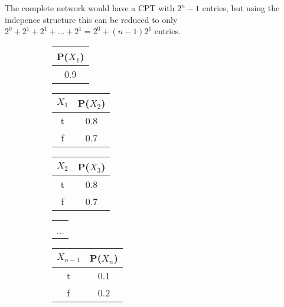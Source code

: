 \documentclass[12pt, letterpaper]{article}
\begin{document}
The complete network would have a CPT with $2^n-1$ entries, but using
the indepence structure this can be reduced to only
$2^0+2^1+2^1+...+2^1 = 2^0 + (n-1)2^1$ entries.

\begin{figure}[H]
  \begin{subfigure}[t]{0.14\textwidth}
    \begin{tabular}[t]{|c|}
      \hline
      P($X_1$) \\
      \hline
      0.9 \\
      \hline
    \end{tabular}
  \end{subfigure}
  \begin{subfigure}[t]{0.2\textwidth}
    \begin{tabular}[t]{|c|c|}
      \hline
      $X_1$ & P($X_2$) \\
      \hline
      t & 0.8 \\
      f & 0.7 \\
      \hline
    \end{tabular}
  \end{subfigure}
  \begin{subfigure}[t]{0.17\textwidth}
    \begin{tabular}[t]{|c|c|}
      \hline
      $X_2$ & P($X_3$) \\
      \hline
      t & 0.8 \\
      f & 0.7 \\
      \hline
    \end{tabular}
  \end{subfigure}
  \begin{subfigure}{0.06\textwidth}
    \begin{tabular}{c}
      \\
      \\
      \\
      \\
      $\cdots$ \\
    \end{tabular}
  \end{subfigure}
  \begin{subfigure}[t]{0.35\textwidth}
    \begin{tabular}[t]{|c|c|}
      \hline
      $X_{n-1}$ & P($X_n$) \\
      \hline
      t & 0.1 \\
      f & 0.2 \\
      \hline
    \end{tabular}
  \end{subfigure}

\end{figure}
\end{document}
